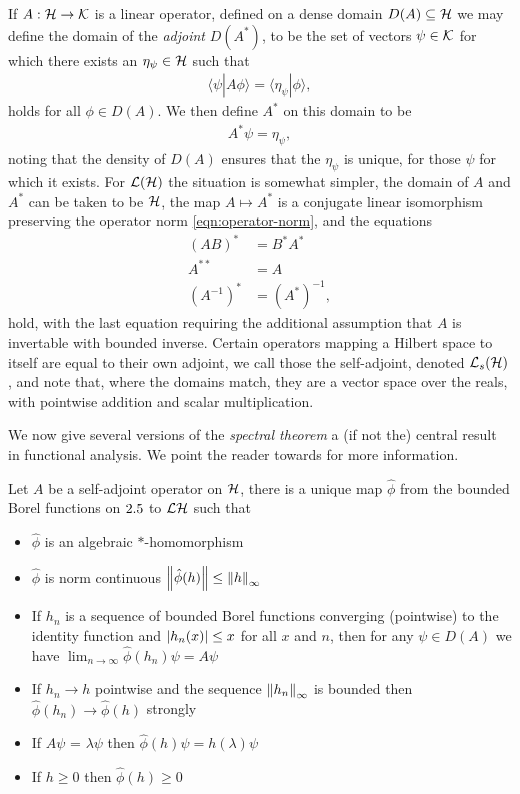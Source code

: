 If $A:\mathcal{H}\to\mathcal{K}$ is a linear operator, defined on a dense domain $D(A)\subseteq \mathcal{H}$ we may define the domain of the \emph{adjoint} $D(A^*)$, to be the set of vectors $\psi \in \mathcal{K}$ for which there exists an $\eta_{\psi}\in \mathcal{H}$ such that
\begin{align}
  \langle \psi | A\phi \rangle  = \langle \eta_{\psi}| \phi\rangle,
\end{align}
holds for all $\phi\in D(A)$. We then define $A^*$ on this domain to be
\begin{align}
  A^* \psi = \eta_{\psi},
\end{align}
noting that the density of $D(A)$ ensures that the $\eta_{\psi}$ is unique, for those $\psi$ for which it exists. For $\bops[\hcal]$ the situation is somewhat simpler, the domain of $A$ and $A^*$ can be taken to be $\mathcal{H}$, the map $A\mapsto A^*$ is a conjugate linear isomorphism preserving the operator norm \eqref{eqn:operator-norm}, and the equations
\begin{align}
  (AB)^* &= B^* A^*\\
  A^{**} &= A\\
  \left(A^{-1}\right)^* &= \left(A^*\right)^{-1},
\end{align}
hold, with the last equation requiring the additional assumption that $A$ is invertable with bounded inverse. Certain operators mapping a Hilbert space to itself are equal to their own adjoint, we call those the self-adjoint, denoted $\saops[\hcal]$, and note that, where the domains match, they are a vector space over the reals, with pointwise addition and scalar multiplication. 

We now give several versions of the \emph{spectral theorem} a (if not the) central result in functional analysis. We point the reader towards  for more information.
\begin{thm}\label{thm:spectral-sa-ops-bounded-functions}
    Let $A$ be a self-adjoint operator on $\mathcal{H}$, there is a unique map $\hat{\phi}$ from the bounded Borel functions on $2.5$ to $\bops{\hcal}$ such that
    \begin{itemize}
      \item $\hat{\phi}$ is an algebraic $*$-homomorphism 
      \item $\hat{\phi}$ is norm continuous ${\left\lVert{\hat{\phi}(h)}\right\rVert} \leq {\left\lVert{h}\right\rVert}_\infty$
      \item If $h_n$ is a sequence of bounded Borel functions converging (pointwise) to the identity function and ${\left\lvert{h_n(x)}\right\rvert} \leq x$ for all $x$ and $n$, then for any $\psi\in D(A)$ we have $\lim_{n\to\infty} \hat{\phi}(h_n)\psi = A\psi$
      \item If $h_n \to h$ pointwise and the sequence ${\left\lVert{h_n}\right\rVert}_\infty$ is bounded then $\hat{\phi}(h_n) \to \hat{\phi}(h)$ strongly
      \item If $A\psi$ = $\lambda\psi$ then $\hat{\phi}(h)\psi = h(\lambda)\psi$
      \item If $h\geq 0$ then $\hat{\phi}(h) \geq 0$
    \end{itemize}
\end{thm}

